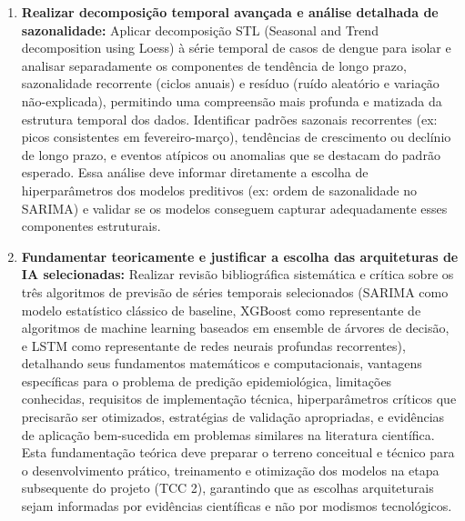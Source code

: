 \begin{enumerate}
    \item \textbf{Realizar decomposição temporal avançada e análise detalhada de sazonalidade:} Aplicar decomposição STL (Seasonal and Trend decomposition using Loess) à série temporal de casos de dengue para isolar e analisar separadamente os componentes de tendência de longo prazo, sazonalidade recorrente (ciclos anuais) e resíduo (ruído aleatório e variação não-explicada), permitindo uma compreensão mais profunda e matizada da estrutura temporal dos dados. Identificar padrões sazonais recorrentes (ex: picos consistentes em fevereiro-março), tendências de crescimento ou declínio de longo prazo, e eventos atípicos ou anomalias que se destacam do padrão esperado. Essa análise deve informar diretamente a escolha de hiperparâmetros dos modelos preditivos (ex: ordem de sazonalidade no SARIMA) e validar se os modelos conseguem capturar adequadamente esses componentes estruturais.
    
    \item \textbf{Fundamentar teoricamente e justificar a escolha das arquiteturas de IA selecionadas:} Realizar revisão bibliográfica sistemática e crítica sobre os três algoritmos de previsão de séries temporais selecionados (SARIMA como modelo estatístico clássico de baseline, XGBoost como representante de algoritmos de machine learning baseados em ensemble de árvores de decisão, e LSTM como representante de redes neurais profundas recorrentes), detalhando seus fundamentos matemáticos e computacionais, vantagens específicas para o problema de predição epidemiológica, limitações conhecidas, requisitos de implementação técnica, hiperparâmetros críticos que precisarão ser otimizados, estratégias de validação apropriadas, e evidências de aplicação bem-sucedida em problemas similares na literatura científica. Esta fundamentação teórica deve preparar o terreno conceitual e técnico para o desenvolvimento prático, treinamento e otimização dos modelos na etapa subsequente do projeto (TCC 2), garantindo que as escolhas arquiteturais sejam informadas por evidências científicas e não por modismos tecnológicos.
    

\end{enumerate}
